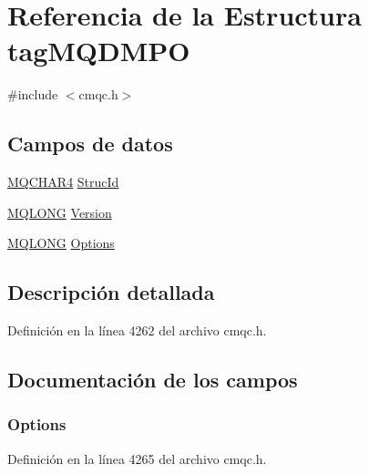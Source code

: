 \hypertarget{structtag_m_q_d_m_p_o}{}\section{Referencia de la Estructura tag\+M\+Q\+D\+M\+P\+O}
\label{structtag_m_q_d_m_p_o}


{\ttfamily \#include $<$cmqc.\+h$>$}

\subsection*{Campos de datos}
\begin{DoxyCompactItemize}
\item 
\hyperlink{cmqc_8h_a12590e546ed66fda7cf21c1d5cefa31d}{M\+Q\+C\+H\+A\+R4} \hyperlink{structtag_m_q_d_m_p_o_a0530922ca944569b52601d74941f96e4}{Struc\+Id}
\item 
\hyperlink{cmqc_8h_a1fb8d28cbda3fa8766a9821230cdb6d5}{M\+Q\+L\+O\+N\+G} \hyperlink{structtag_m_q_d_m_p_o_a0656ef8f766b3907d394d88a35d7b7e9}{Version}
\item 
\hyperlink{cmqc_8h_a1fb8d28cbda3fa8766a9821230cdb6d5}{M\+Q\+L\+O\+N\+G} \hyperlink{structtag_m_q_d_m_p_o_ad7aff2d6c6044809464380998d24ec5c}{Options}
\end{DoxyCompactItemize}


\subsection{Descripción detallada}


Definición en la línea 4262 del archivo cmqc.\+h.



\subsection{Documentación de los campos}
\hypertarget{structtag_m_q_d_m_p_o_ad7aff2d6c6044809464380998d24ec5c}{}
\subsubsection[{Options}]{ Options}\label{structtag_m_q_d_m_p_o_ad7aff2d6c6044809464380998d24ec5c}


Definición en la línea 4265 del archivo cmqc.\+h.

